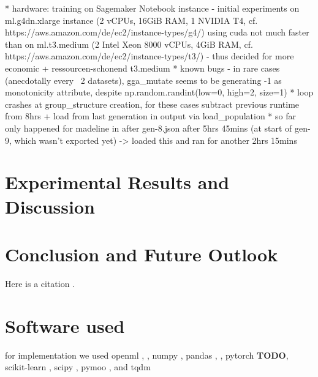 \documentclass[twoside,11pt]{article}
\begin{document}
  * hardware: training on Sagemaker Notebook instance
    - initial experiments on ml.g4dn.xlarge instance (2 vCPUs, 16GiB RAM, 1 NVIDIA T4, cf. https://aws.amazon.com/de/ec2/instance-types/g4/)
    using cuda not much faster than on ml.t3.medium (2 Intel Xeon 8000 vCPUs, 4GiB RAM, cf. https://aws.amazon.com/de/ec2/instance-types/t3/)
    - thus decided for more economic + ressourcen-schonend t3.medium
  * known bugs
    - in rare cases (anecdotally every ~2 datasets), gga\_mutate seems to be generating -1 as monotonicity attribute, despite np.random.randint(low=0, high=2, size=1)
      * loop crashes at group\_structure creation, for these cases subtract previous runtime from 8hrs + load from last generation in output via load\_population
      * so far only happened for madeline in after gen-8.json after 5hrs 45mins (at start of gen-9, which wasn't exported yet) -> loaded this and ran for another 2hrs 15mins


\section{Experimental Results and Discussion}


\section{Conclusion and Future Outlook}

Here is a citation \cite{EAGGA}.


\newpage

\appendix
\section{Software used}
for implementation we used openml \cite{OpenML}, \cite{OpenMLPython}, numpy \cite{numpy}, pandas \cite{pandas1}, \cite{pandas2}, pytorch \textbf{TODO},
scikit-learn \cite{scikit-learn}, scipy \cite{SciPy}, pymoo \cite{pymoo}, and tqdm \cite{tqdm}

\section{}
\label{app:theorem}

\end{document}
